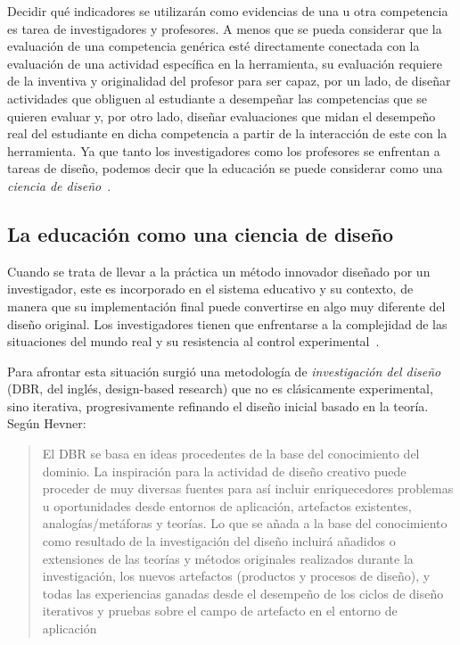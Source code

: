 Decidir qué indicadores se utilizarán como evidencias de una u otra competencia es tarea de investigadores y profesores. A menos que se pueda considerar que la evaluación de una competencia genérica esté directamente conectada con la evaluación de una actividad específica en la herramienta, su evaluación requiere de la inventiva y originalidad del profesor para ser capaz, por un lado, de diseñar actividades que obliguen al estudiante a desempeñar las competencias que se quieren evaluar y, por otro lado, diseñar evaluaciones que midan el desempeño real del estudiante en dicha competencia a partir de la interacción de este con la herramienta. Ya que tanto los investigadores como los profesores se enfrentan a tareas de diseño, podemos decir que la educación se puede considerar como una \emph{ciencia de diseño}~\cite{laurillard2012teaching}. 

\subsection*{La educación como una ciencia de diseño}
\label{sec:dbr}

Cuando se trata de llevar a la práctica un método innovador diseñado por un investigador, este es incorporado en el sistema educativo y su contexto, de manera que su implementación final puede convertirse en algo muy diferente del diseño original. Los investigadores tienen que enfrentarse a la complejidad de las situaciones del mundo real y su resistencia al control experimental~\cite{collins2004design}. 

Para afrontar esta situación surgió una metodología de \emph{investigación del diseño} (DBR, del inglés, design-based research) que no es clásicamente experimental, sino iterativa, progresivamente refinando el diseño inicial basado en la teoría. Según Hevner:
\begin{quote}
El DBR se basa en ideas procedentes de la base del conocimiento del dominio. La inspiración para la actividad de diseño creativo puede proceder de muy diversas fuentes para así incluir enriquecedores problemas u oportunidades desde entornos de aplicación, artefactos existentes, analogías/metáforas y teorías. Lo que se añada a la base del conocimiento como resultado de la investigación del diseño incluirá añadidos o extensiones de las teorías y métodos originales realizados durante la investigación, los nuevos artefactos (productos y procesos de diseño), y todas las experiencias ganadas desde el desempeño de los ciclos de diseño iterativos y pruebas sobre el campo de artefacto en el entorno de aplicación~\cite{hevner2009interview}
\end{quote}

